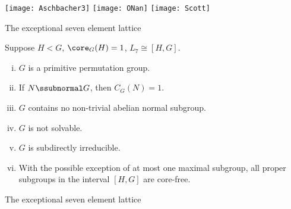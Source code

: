 \begin{frame}[fragile,label=AOS]{}
\begin{center}
\texttt{[image: Aschbacher3]}
\hskip2mm
\texttt{[image: ONan]}
\hskip2mm
\texttt{[image: Scott]}
 \end{center}

\end{frame}



\begin{frame}[fragile,label=Example7elementPreziOld,shrink=5]{The exceptional seven element lattice}
    \begin{theorem}
      \label{thm:except-seven-elem}
      Suppose $H<G$, \hskip2mm $\core_G(H) = 1$, \hskip2mm $L_7 \cong [H,G]$.
      \begin{enumerate}[(i)]
      \item<1-> $G$ is a primitive permutation group.
      \item<1-> If $N\ssubnormal G$, then $C_G(N) = 1$.
      \item<1-> $G$ contains no non-trivial abelian normal subgroup.
      \item<1-> $G$ is not solvable.
      \item<1-> $G$ is subdirectly irreducible.
      \item<1-> With the possible exception of at most one maximal subgroup, %
        all proper subgroups in the interval $[H,G]$ are core-free. 
      \end{enumerate}
    \end{theorem}
\end{frame}


\begin{frame}[fragile,label=Example7elementPreziBigFig]{The exceptional seven element lattice}
      \begin{center}
    {
}
      \end{center}
\end{frame}

